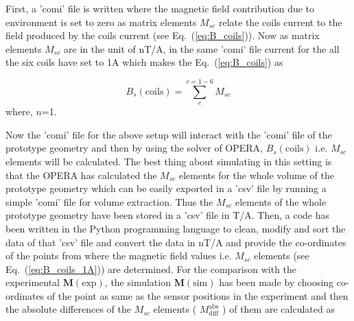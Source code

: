  First, a 'comi' file is written where the magnetic field contribution due to environment is set to zero as  matrix elements $M_{sc}$ relate the coils current to the field produced by the coils current (see Eq.~(\ref{eq:B_coils})). Now as matrix elements $M_{sc}$ are in the unit of nT/A, in the same 'comi' file current for the all the six coils have set to 1A which makes the Eq.~(\ref{eq:B_coils}) as

\begin{equation}\label{eq:B_coils_1A}
    B_s(\text{coils})=\sum_c^{c=1-6} M_{sc}
\end{equation}
where, $n$=1.

Now the 'comi' file for the above setup will interact with the 'comi' file of the prototype geometry and then by using the solver of OPERA, $B_s(\text{coils})$ i.e. $M_{sc}$ elements will be calculated.  The best thing about simulating in this setting is that the OPERA has calculated the $M_{sc}$ elements for the whole volume of the prototype geometry which can be easily exported in a 'csv' file by running a simple 'comi' file for volume extraction. Thus the $M_{sc}$ elements of the whole prototype geometry have been stored in a 'csv' file in T/A. Then, a code has been written in the Python programming language to clean, modify and sort the data of that 'csv' file and convert the data in nT/A and  provide the co-ordinates of the points from where the magnetic field values i.e.  $M_{sc}$ elements (see Eq.~(\ref{eq:B_coils_1A})) are determined. For the comparison with the experimental $\bm{M}(\text{exp})$, the simulation $\bm{M}(\text{sim})$ has been made by choosing co-ordinates of the point as same as the sensor positions in the experiment and then the absolute differences of the  $M_{sc}$ elements ( $M_{\text{diff}}^{\text{abs}}$ ) of them are calculated as

